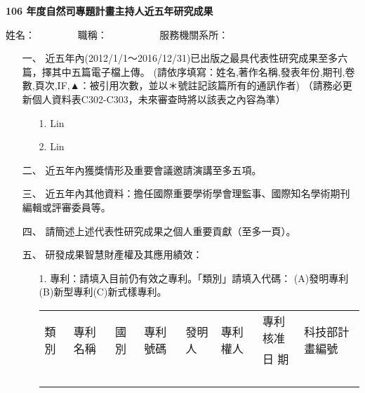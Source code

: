 \documentclass[12pt,a4paper,openany]{article}
\begin{document}
\newtheorem{thm}{Theorem}
\newtheorem{lem}{Lemma}
\newtheorem{cor}{Corollary}
\newtheorem{prop}{Proposition}
\newtheorem{conj}{Conjecture}

\baselineskip 7mm

\begin{center}
{\bf \large  {\color {red}106} 年度自然司專題計畫主持人近五年研究成果 }
\end{center}


姓名：　　　　 職稱：　　　　 　服務機關系所：　　　　　　　　

\begin{enumerate}
 \item [一、]近五年內(2012/1/1～2016/12/31)已出版之最具代表性研究成果至多六篇，擇其中五篇電子檔上傳。
 {\small (請依序填寫：姓名,著作名稱,發表年份,期刊,卷數,頁次,IF,▲：被引用次數，並以＊號註記該篇所有的通訊作者)}\newline
 {\color{red}\small （請務必更新個人資料表C302-C303，未來審查時將以該表之內容為準）}
  \begin{enumerate}
  \item[1.]  Lin
  \item[2.]  Lin
  \end{enumerate}
 
 
 \item [二、]
近五年內獲獎情形及重要會議邀請演講至多五項。


 \item [三、] 近五年內其他資料：擔任國際重要學術學會理監事、國際知名學術期刊編輯或評審委員等。
 
 \item [四、] 請簡述上述代表性研究成果之個人重要貢獻（至多一頁）。
 
 \item [五、] 研發成果智慧財產權及其應用績效：
 \begin{itemize}
 \item[1.]  專利：請填入目前仍有效之專利。「類別」請填入代碼：
  (A)發明專利(B)新型專利(C)新式樣專利。
  \begin{table}[h!]
  \centering
  \begin{tabular}{|l|l|l|l|l|l|l|l|}
  \hline
  \multirow{2}{*}{類別} & \multirow{2}{*}{專利名稱} & \multirow{2}{*}{國別} & \multirow{2}{*}{專利號碼} & \multirow{2}{*}{發明人} & \multirow{2}{*}{專利權人} & 專利核准 & \multirow{2}{*}{科技部計畫編號} \\ 
   &   &  &  &  &  & 日    期 &    \\ \hline
   &  &  &  &  &  &   &  \\ \hline
   &  &  &  &  &  &   &  \\ \hline
   &  &  &  &  &  &   &  \\ \hline
   &  &  &  &  &  &   &  \\ \hline
  \end{tabular}
  \end{table}
 

\end{itemize}
\end{enumerate}
\end{document}
